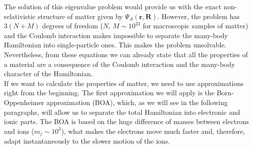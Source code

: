 The solution of this eigenvalue problem would provide us with the exact non-relativistic structure of matter given by $\Psi_{A}(\mathbf{r},\mathbf{R})$. However, the problem 
has $3(N+M)$ degrees of freedom ($N$, $M\sim10^{23}$ for macroscopic samples of matter) and the Coulomb interaction makes impossible to separate the many-body Hamiltonian into single-particle ones. This makes the problem 
unsolvable. Nevertheless, from these equations we can already state that all the properties of a material are a consequence of the Coulomb interaction and the many-body character of the Hamiltonian. \\

If we want to calculate the properties of matter, we need to use approximations right from the beginning. The first approximation we will apply is the Born-Oppenheimer approximation (BOA), which, as we will see in the 
following paragraphs, will allow us to separate the total Hamiltonian into electronic and ionic parts. The BOA is based on the huge difference of masses between electrons and ions ($m_{j}\sim10^{3}$), what makes the 
electrons move much faster\cite{ashcroft1976solid} and, therefore, adapt instantaneously to the slower motion of the ions. \\

